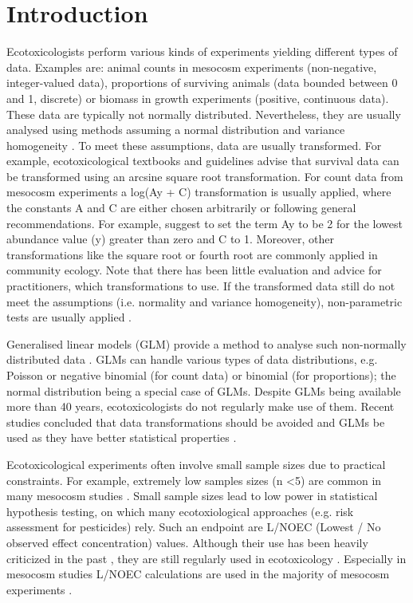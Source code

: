\documentclass[twocolumn, natbib]{svjour3}
\begin{document}
\section{Introduction}
\label{sec:intro}
Ecotoxicologists perform various kinds of experiments yielding different types of data.
Examples are: animal counts in mesocosm experiments (non-negative, integer-valued data), proportions of surviving animals (data bounded between 0 and 1, discrete) or biomass in growth experiments (positive, continuous data).
These data are typically not normally distributed. 
Nevertheless, they are usually analysed using methods assuming a normal distribution and variance homogeneity \citep{wang_making_2011}. 
To meet these assumptions, data are usually transformed.
For example, ecotoxicological textbooks \citep{newman_quantitative_2012} and guidelines \citep{epa_methods_2002,oecd_current_2006} advise that survival data can be transformed using an arcsine square root transformation. 
For count data from mesocosm experiments a log(Ay + C) transformation is usually applied, where the constants A and C are either chosen arbitrarily or following general recommendations. 
For example, \citet{van_den_brink_impact_2000} suggest to set the term Ay to be 2 for the lowest abundance value (y) greater than zero and C to 1. 
Moreover, other transformations like the square root or fourth root are commonly applied in community ecology.
Note that there has been little evaluation and advice for practitioners, which transformations to use.
If the transformed data still do not meet the assumptions (i.e. normality and variance homogeneity), non-parametric tests are usually applied \citep{wang_making_2011}.

Generalised linear models (GLM) provide a method to analyse such non-normally distributed data \citep{nelder_generalized_1972}.
GLMs can handle various types of data distributions, e.g. Poisson or negative binomial (for count data) or binomial (for proportions); the normal distribution being a special case of GLMs.
Despite GLMs being available more than 40 years, ecotoxicologists do not regularly make use of them.
Recent studies concluded that data transformations should be avoided and GLMs be used as they have better statistical properties \citep{ohara_not_2010, warton_arcsine_2011,warton_many_2005}. 

Ecotoxicological experiments often involve small sample sizes due to practical constraints. 
For example, extremely low samples sizes (n \textless 5) are common in many mesocosm studies \citep{sanderson_pesticide_2002,szocs_analysing_2015}.
Small sample sizes lead to low power in statistical hypothesis testing, on which many ecotoxiological approaches (e.g. risk assessment for pesticides) rely. 
Such an endpoint are L/NOEC (Lowest / No observed effect concentration) values.
Although their use has been heavily criticized in the past \citep{laskowski_good_1995},  they are still regularly used in ecotoxicology \citep{jager_bad_2012}.
Especially in mesocosm studies L/NOEC calculations are used in the majority of mesocosm experiments \citep{brock_minimum_2015, efsa_ppr_guidance_2013}. 
\end{document}
